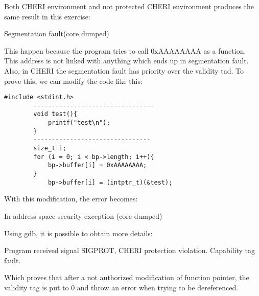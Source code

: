 \documentclass[a4paper, 11pt]{article}
\begin{document}
	Both CHERI environment and not protected CHERI environment produces the same result in this exercise:
	\begin{tcolorbox}[colback=gray!5!white, colframe=gray!75!black, title=Output On both environment]
	Segmentation fault(core dumped)
	\end{tcolorbox}
	This happen because the program tries to call 0xAAAAAAAA as a function. This address is not linked with anything which ends up in segmentation fault.
	Also, in CHERI the segmentation fault has priority over the validity tad. To prove this, we can modify the code like this:


	\begin{lstlisting}[caption=Control flow modified C Code]
		#include <stdint.h>
		---------------------------------
		void test(){
			printf("test\n");
		}
		--------------------------------
		size_t i;
		for (i = 0; i < bp->length; i++){
        	bp->buffer[i] = 0xAAAAAAAA;
		}
        	bp->buffer[i] = (intptr_t)(&test);
	\end{lstlisting}
	With this modification, the error becomes:
	\begin{tcolorbox}[colback=gray!5!white, colframe=blue!75!black, title=Output of modified Code run with CHERI protection ]
		In-address space security exception (core dumped)
	\end{tcolorbox}
	Using gdb, it is possible to obtain more details: 
	\begin{tcolorbox}[colback=gray!5!white, colframe=black!75!black, title=GDB Output of modified Code run with CHERI protection ]
		Program received signal SIGPROT, CHERI protection violation.
		Capability tag fault.
	\end{tcolorbox}
	Which proves that after a not authorized modification of function pointer, the validity tag is put to 0 and throw an error when trying to be dereferenced.
	
\end{document}
